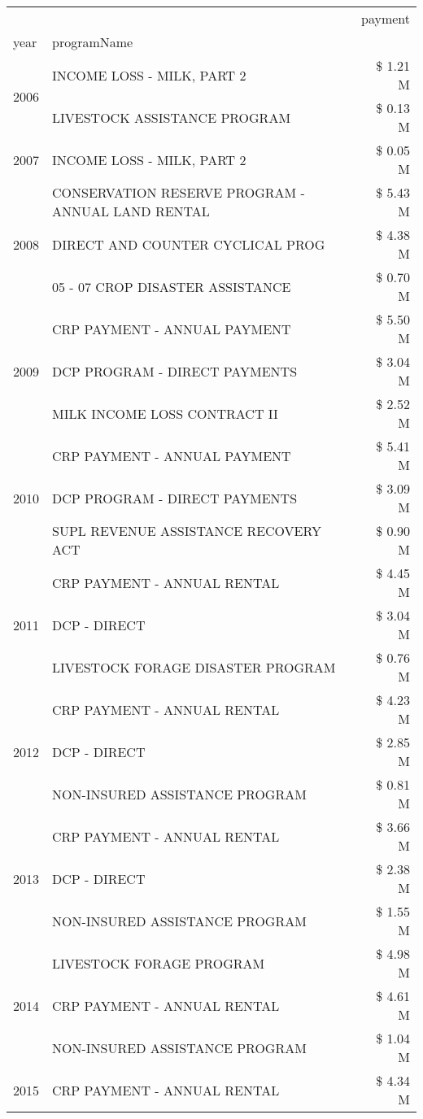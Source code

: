 \begin{tabular}{llr}
\toprule
 &  & payment \\
year & programName &  \\
\midrule
\multirow[t]{2}{*}{2006} & INCOME LOSS - MILK, PART 2 & \$ 1.21 M \\
 & LIVESTOCK ASSISTANCE PROGRAM & \$ 0.13 M \\
\cline{1-3}
2007 & INCOME LOSS - MILK, PART 2 & \$ 0.05 M \\
\cline{1-3}
\multirow[t]{3}{*}{2008} & CONSERVATION RESERVE PROGRAM - ANNUAL LAND RENTAL & \$ 5.43 M \\
 & DIRECT AND COUNTER CYCLICAL PROG & \$ 4.38 M \\
 & 05 - 07 CROP DISASTER ASSISTANCE & \$ 0.70 M \\
\cline{1-3}
\multirow[t]{3}{*}{2009} & CRP PAYMENT - ANNUAL PAYMENT & \$ 5.50 M \\
 & DCP PROGRAM - DIRECT PAYMENTS & \$ 3.04 M \\
 & MILK INCOME LOSS CONTRACT II & \$ 2.52 M \\
\cline{1-3}
\multirow[t]{3}{*}{2010} & CRP PAYMENT - ANNUAL PAYMENT & \$ 5.41 M \\
 & DCP PROGRAM - DIRECT PAYMENTS & \$ 3.09 M \\
 & SUPL REVENUE ASSISTANCE RECOVERY ACT & \$ 0.90 M \\
\cline{1-3}
\multirow[t]{3}{*}{2011} & CRP PAYMENT - ANNUAL RENTAL & \$ 4.45 M \\
 & DCP - DIRECT & \$ 3.04 M \\
 & LIVESTOCK FORAGE DISASTER PROGRAM & \$ 0.76 M \\
\cline{1-3}
\multirow[t]{3}{*}{2012} & CRP PAYMENT - ANNUAL RENTAL & \$ 4.23 M \\
 & DCP - DIRECT & \$ 2.85 M \\
 & NON-INSURED ASSISTANCE PROGRAM & \$ 0.81 M \\
\cline{1-3}
\multirow[t]{3}{*}{2013} & CRP PAYMENT - ANNUAL RENTAL & \$ 3.66 M \\
 & DCP - DIRECT & \$ 2.38 M \\
 & NON-INSURED ASSISTANCE PROGRAM & \$ 1.55 M \\
\cline{1-3}
\multirow[t]{3}{*}{2014} & LIVESTOCK FORAGE PROGRAM & \$ 4.98 M \\
 & CRP PAYMENT - ANNUAL RENTAL & \$ 4.61 M \\
 & NON-INSURED ASSISTANCE PROGRAM & \$ 1.04 M \\
\cline{1-3}
\multirow[t]{3}{*}{2015} & CRP PAYMENT - ANNUAL RENTAL & \$ 4.34 M \\

\end{tabular}
